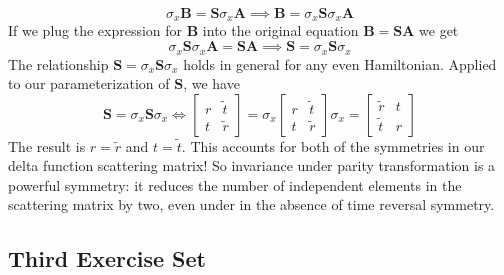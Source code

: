 \documentclass[11pt, a4paper]{article}
\renewcommand{\vec}[1]{\bm{#1}} %
\newcommand{\mat}[1]{\mathbf{#1}} %
\begin{document}
\begin{itemize}
\begin{equation*}
		\sigma_{x}\vec{B} = \mat{S} \sigma_{x}\vec{A} \implies \vec{B} = \sigma_{x} \mat{S} \sigma_{x}\vec{A}
	\end{equation*}
	If we plug the expression for $ \vec{B} $ into the original equation $ \vec{B} = \mat{S} \vec{A} $ we get
	\begin{equation*}
		\sigma_{x} \mat{S} \sigma_{x}\vec{A} = \mat{S} \vec{A} \implies \mat{S} = \sigma_{x} \mat{S} \sigma_{x}
	\end{equation*}
	The relationship $ \mat{S} = \sigma_{x} \mat{S} \sigma_{x} $ holds in general for any even Hamiltonian. Applied to our parameterization of $ \mat{S} $, we have
	\begin{equation*}
		\mat{S} = \sigma_{x} \mat{S} \sigma_{x} \iff
		\begin{bmatrix}
			r & \tilde{t}\\
			t & \tilde{r}
		\end{bmatrix}
		= \sigma_{x}
		\begin{bmatrix}
			r & \tilde{t}\\
			t & \tilde{r}
		\end{bmatrix}
		\sigma_{x}
		=
		\begin{bmatrix}
			\tilde{r} & t\\
			\tilde{t} & r
		\end{bmatrix}
	\end{equation*}
	The result is $ r = \tilde{r} $ and $ t = \tilde{t} $. This accounts for both of the symmetries in our delta function scattering matrix! So invariance under parity transformation is a powerful symmetry: it reduces the number of independent elements in the scattering matrix by two, even under in the absence of time reversal symmetry.
	
	
\end{itemize}

\subsection{Third Exercise Set} 
\end{document}
